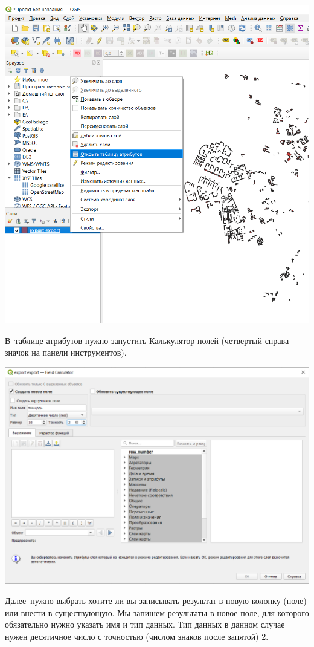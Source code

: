 \documentclass[
]{book}
\begin{document}
\includegraphics{figures/41.png}

В~таблице атрибутов нужно запустить Калькулятор полей (четвертый справа значок на панели инструментов).

\includegraphics{figures/42.png}

Далее~нужно выбрать хотите ли вы записывать результат в новую колонку (поле) или внести в существующую. Мы запишем результаты в новое поле, для которого обязательно нужно указать имя и тип данных. Тип данных в данном случае нужен десятичное число с точностью (числом знаков после запятой) 2.
\end{document}
